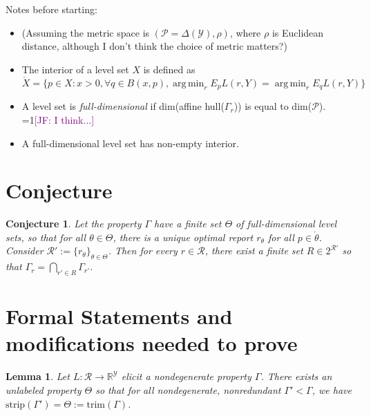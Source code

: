 \documentclass[12pt]{article}
\newcommand{\Comments}{1}
\newcommand{\mynote}[2]{\ifnum\Comments=1\textcolor{#1}{#2}\fi}
\newcommand{\jessie}[1]{\mynote{purple}{[JF: #1]}}
\newcommand{\reals}{\mathbb{R}}
\renewcommand{\P}{\mathcal{P}}
\newcommand{\R}{\mathcal{R}}
\newcommand{\Y}{\mathcal{Y}}
\newcommand{\inter}[1]{\mathring{#1}}%
\newcommand{\strip}{\text{strip}}
\DeclareMathOperator*{\argmin}{arg\,min}
\newtheorem{lemma}{Lemma}
\newtheorem{definition}{Definition}
\newtheorem{conjecture}{Conjecture}
\begin{document}


Notes before starting:
\begin{itemize}
\item (Assuming the metric space is $(\P = \Delta(\Y), \rho)$, where $\rho$ is Euclidean distance, although I don't think the choice of metric matters?)
\item The interior of a level set $X$ is defined as $\inter{X} = \{p \in X: x > 0,  \forall q \in B(x,p), \argmin_rE_p L(r,Y) = \argmin_r E_q L(r,Y)\}$
\item A level set is \emph{full-dimensional} if dim(affine hull($\Gamma_r$)) is equal to dim($\P$). \jessie{I think...}
\item A full-dimensional level set has non-empty interior.
\end{itemize}

\section{Conjecture}


\begin{conjecture}\label{conj:intersect-lev-sets}
  Let the property $\Gamma$ have a finite set $\Theta$ of full-dimensional level sets, so that for all $\theta \in \Theta$,  there is a unique optimal report $r_\theta$ for all $p \in \inter{\theta}$.
  Consider $\R' := \{ r_\theta\}_{\theta \in \Theta}$.
  Then for every $r \in \R$, there exist a finite set $R \in 2^{\R'}$ so that $\Gamma_r = \bigcap_{r' \in R} \Gamma_{r'}$.
\end{conjecture}


\section{Formal Statements and modifications needed to prove}


\begin{lemma}
  Let $L: \R \to \reals^\Y$ elicit a nondegenerate property $\Gamma$.
There exists an unlabeled property $\Theta$ so that for all nondegenerate, nonredundant $\Gamma' < \Gamma$, we have $\strip(\Gamma') = \Theta := \text{trim}(\Gamma)$.
\end{lemma}
\end{document}
